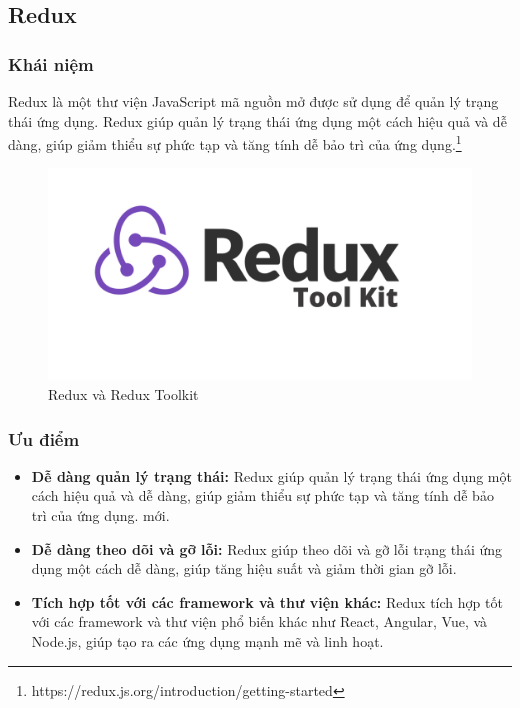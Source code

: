 \subsection{Redux}
\subsubsection{Khái niệm}
\noindent Redux là một thư viện JavaScript mã nguồn mở được sử dụng để quản lý trạng thái ứng dụng. Redux giúp quản lý trạng thái ứng dụng một cách hiệu quả và dễ dàng, giúp giảm thiểu sự phức tạp và tăng tính dễ bảo trì của ứng dụng.\footnote{https://redux.js.org/introduction/getting-started}
\begin{figure}[H]
  \begin{center}
    \includegraphics[scale=0.3]{images/hieu/phuluc/redux.png}
    \caption{Redux và Redux Toolkit}
  \end{center}
\end{figure}

\subsubsection{Ưu điểm}
\begin{itemize}
  \item \textbf{Dễ dàng quản lý trạng thái:} Redux giúp quản lý trạng thái ứng dụng một cách hiệu quả và dễ dàng, giúp giảm thiểu sự phức tạp và tăng tính dễ bảo trì của ứng dụng.
  mới.
  \item \textbf{Dễ dàng theo dõi và gỡ lỗi:} Redux giúp theo dõi và gỡ lỗi trạng thái ứng dụng một cách dễ dàng, giúp tăng hiệu suất và giảm thời gian gỡ lỗi.
  \item \textbf{Tích hợp tốt với các framework và thư viện khác:} Redux tích hợp tốt với các framework và thư viện phổ biến khác như React, Angular, Vue, và Node.js, giúp tạo ra các ứng dụng mạnh mẽ và linh hoạt.  
\end{itemize}
